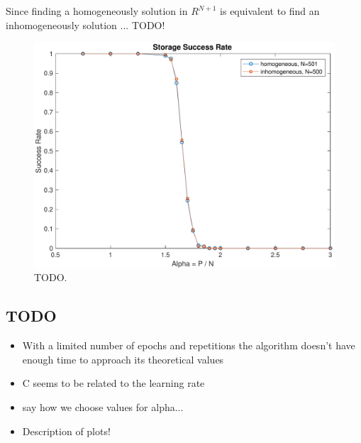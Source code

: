Since finding a homogeneously solution in $R^{N+1}$ is equivalent to find an inhomogeneously solution ... TODO!

\begin{figure}[t]
	\centering
	\includegraphics[width=\columnwidth]{figures/homogeneous_n_n1}
    \caption{TODO.}
	\label{fig:homogeneous_n_n1}
\end{figure}

\subsection{TODO}
\begin{itemize}
    \item With a limited number of epochs and repetitions the algorithm doesn't have enough time to approach its theoretical values
    \item C seems to be related to the learning rate
    \item say how we choose values for alpha...
    \item Description of plots!
\end{itemize}
